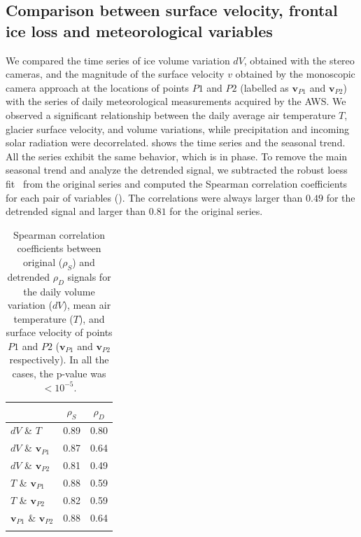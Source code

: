 \subsection{Comparison between surface velocity, frontal ice loss and meteorological
  variables}\label{sec:4:res_temp_comparison}

We compared the time series of ice volume variation \(dV\), obtained with the stereo
cameras, and the magnitude of the surface velocity \(v\) obtained by the monoscopic
camera approach at the locations of points \(P1\) and \(P2\) (labelled as
\(\mathbf{v}_{P1}\) and \(\mathbf{v}_{P2}\)) with the series of daily
meteorological measurements acquired by the AWS.
We observed a significant relationship between the daily average air temperature \(T\),
glacier surface velocity, and volume variations, while precipitation and incoming solar
radiation were decorrelated.  shows the time series and
the seasonal trend.
All the series exhibit the same behavior, which is in phase.
To remove the main seasonal trend and analyze the detrended signal, we subtracted the
robust
loess fit~\citep{Cleveland1979} from the original series and computed the Spearman
correlation coefficients for each pair of variables
().
The correlations were always larger than \(0.49\) for the detrended signal and larger
than \(0.81\) for the original series.

\begin{table}
  \centering
  \caption{Spearman correlation coefficients between original (\(\rho_S\))
    and detrended \(\rho_D\) signals for the daily volume variation (\(dV\)), mean air
    temperature
    (\(T\)), and surface velocity of points \(P1\) and \(P2\) (\(\mathbf{v}_{P1}\) and
    \(\mathbf{v}_{P2}\) respectively).
    In all the cases, the p-value was \(< 10^{-5}\).}
  \label{tab:4:correlation_coefficients}
  \begin{tabular}{lcc}
                                               & \(\rho_S\) & \(\rho_D\) \\
    \hline\noalign{\smallskip}

    \(dV\) \& \(T\)                            & 0.89       & 0.80       \\
    \(dV\) \& \(\mathbf{v}_{P1}\)              & 0.87       & 0.64       \\
    \(dV\) \& \(\mathbf{v}_{P2}\)              & 0.81       & 0.49       \\
    \(T\) \&  \(\mathbf{v}_{P1}\)              & 0.88       & 0.59       \\
    \(T\) \&  \(\mathbf{v}_{P2}\)              & 0.82       & 0.59       \\
    \(\mathbf{v}_{P1}\) \& \(\mathbf{v}_{P2}\) & 0.88       & 0.64       \\
    \noalign{\smallskip}\hline
  \end{tabular}
\end{table}

